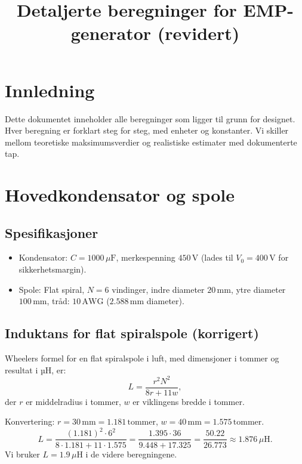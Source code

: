 \documentclass{article}
\title{Detaljerte beregninger for EMP-generator (revidert)}
\author{}
\date{}
\begin{document}
\maketitle

\section{Innledning}
Dette dokumentet inneholder alle beregninger som ligger til grunn for designet. Hver beregning er forklart steg for steg, med enheter og konstanter. Vi skiller mellom teoretiske maksimumsverdier og realistiske estimater med dokumenterte tap.

\section{Hovedkondensator og spole}

\subsection{Spesifikasjoner}
\begin{itemize}
\item Kondensator: $C = 1000\,\mu\text{F}$, merkespenning $450\,\text{V}$ (lades til $V_0 = 400\,\text{V}$ for sikkerhetsmargin).
\item Spole: Flat spiral, $N = 6$ vindinger, indre diameter $20\,\text{mm}$, ytre diameter $100\,\text{mm}$, tråd: $10\,\text{AWG}$ ($2.588\,\text{mm}$ diameter).
\end{itemize}

\subsection{Induktans for flat spiralspole (korrigert)}
Wheelers formel for en flat spiralspole i luft, med dimensjoner i tommer og resultat i µH, er:
\begin{equation}
L = \frac{r^2 N^2}{8r + 11w},
\end{equation}
der $r$ er middelradius i tommer, $w$ er viklingens bredde i tommer.

Konvertering: $r = 30\,\text{mm} = 1.181\,\text{tommer}$, $w = 40\,\text{mm} = 1.575\,\text{tommer}$.
\begin{equation}
L = \frac{(1.181)^2 \cdot 6^2}{8 \cdot 1.181 + 11 \cdot 1.575} = \frac{1.395 \cdot 36}{9.448 + 17.325} = \frac{50.22}{26.773} \approx 1.876\,\mu\text{H}.
\end{equation}
Vi bruker $L = 1.9\,\mu\text{H}$ i de videre beregningene.
\end{document}
